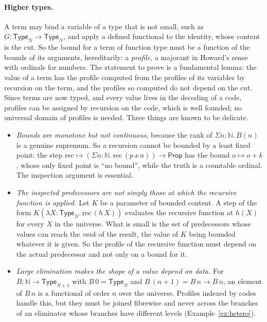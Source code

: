 \documentclass[10pt]{article}
\newcommand{\N}{\mathbb{N}}
\newcommand{\Prop}{\mathsf{Prop}}
\newcommand{\Type}{\mathsf{Type}}
\begin{document}
\paragraph{Higher types.}
A term may bind a variable of a type that is not small, such as
$G:\Type_N\to\Type_N$, and apply a defined functional to the identity,
whose content is the cut. So the bound for a term of function type must
be a function of the bounds of its arguments, hereditarily: a
\emph{profile}, a majorant in Howard's sense \cite{howard73} with
ordinals for numbers. The statement to prove is a fundamental lemma:
the value of a term has the profile computed from the profiles of its
variables by recursion on the term, and the profiles so computed do not
depend on the cut. Since terms are now typed, and every value lives in
the decoding of a code, profiles can be assigned by recursion on the
code, which is well founded; no universal domain of profiles is needed.
Three things are known to be delicate.
\begin{itemize}
\item \emph{Bounds are monotone but not continuous}, because the rank of
  $\Sigma n{:}\N.\,B(n)$ is a genuine supremum. So a recursion cannot be
  bounded by a least fixed point: the step
  $\mathrm{rec}\mapsto(\Sigma n{:}\N.\,\mathrm{rec}\,(p\,x\,n))\to\Prop$ has the
  bound $o\mapsto o+k$, whose only fixed point is ``no bound'', while the
  truth is a countable ordinal. The inspection argument is essential.
\item \emph{The inspected predecessors are not simply those at which the
  recursive function is applied.} Let $K$ be a parameter of bounded
  content. A step of the form
  $K(\lambda X{:}\Type_N.\,\mathrm{rec}\,(h\,X))$ evaluates the recursive
  function at $h(X)$ for every $X$ in the universe.
  What is small is the set of predecessors whose values can reach the
  \emph{rank} of the result, the value of $K$ being bounded whatever it
  is given. So the profile of the recursive function must depend on the
  actual predecessor and not only on a bound for it.
\item \emph{Large elimination makes the shape of a value depend on
  data.} For $B:\N\to\Type_{N+1}$ with $B\,0=\Type_N$ and
  $B\,(n{+}1)=B\,n\to B\,n$, an element of $B\,n$ is a functional of order
  $n$ over the universe. Profiles indexed by codes handle this, but they
  must be joined fibrewise and never across the branches of an
  eliminator whose branches have different levels
  (Example~\ref{ex:hetero}).
\end{itemize}
\end{document}
